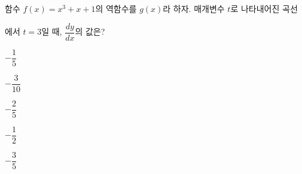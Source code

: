 함수 $f(x)=x^3+x+1$의 역함수를 $g(x)$라 하자. 매개변수 $t$로 나타내어진 곡선 \par\smallskip{}\par\smallskip\noindent 에서 $t=3$일 때, $\dfrac{dy}{dx}$의 값은?
\begin{choices32}{\rule[-3ex]{0pt}{8ex}$-\dfrac{1}{5}$}{\rule[-3ex]{0pt}{8ex}$-\dfrac{3}{10}$}{\rule[-3ex]{0pt}{8ex}$-\dfrac{2}{5}$}{\rule[-3ex]{0pt}{8ex}$-\dfrac{1}{2}$}{\rule[-3ex]{0pt}{8ex}$-\dfrac{3}{5}$}\end{choices32}
